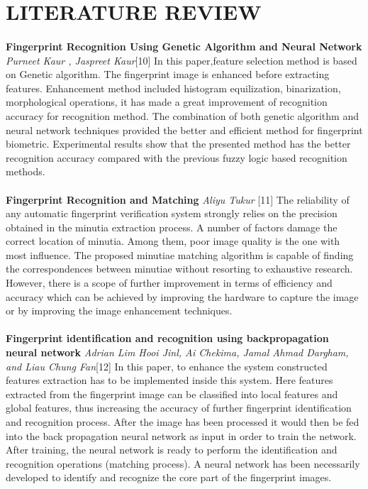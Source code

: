 \documentclass[a4paper,12pt,oneside]{article}
\begin{document}
\newpage
\section{LITERATURE REVIEW}
\paragraph{}
\textbf{Fingerprint Recognition Using Genetic Algorithm and Neural Network} \textit{Purneet Kaur , Jaspreet Kaur}[10] In this paper,feature selection method is based on Genetic algorithm. The fingerprint image is enhanced before extracting features. Enhancement method included histogram equilization, binarization, morphological operations, it has made a great improvement of recognition accuracy for recognition method. The combination of both genetic algorithm and neural network techniques provided the better and efficient method for fingerprint biometric. Experimental results show that the presented method has the better recognition accuracy compared with the previous fuzzy logic based recognition methods.
 
\paragraph{}
\textbf{Fingerprint Recognition and Matching }\textit{Aliyu Tukur
}[11] The reliability of any automatic fingerprint verification system strongly relies on the precision obtained in the minutia extraction process. A number of factors damage the correct location of minutia. Among them, poor image quality is the one with most influence. The proposed minutiae matching algorithm is  capable of finding the correspondences between minutiae without resorting to exhaustive research. However, there is a scope of further improvement in terms of efficiency and accuracy which can be achieved by improving  the hardware to
capture the image or by improving the image enhancement techniques.






\paragraph{}
\textbf{Fingerprint identification and recognition using backpropagation neural network}\textit{ Adrian Lim Hooi Jinl, Ai Chekima, Jamal Ahmad Dargham, and Liau Chung Fan}[12] In this paper, to enhance the system constructed features
extraction has to be implemented inside this system.
Here features extracted from the
fingerprint image can be classified into local features
and global features, thus increasing the accuracy of
further fingerprint identification and recognition
process. After the image has been processed it
would then be fed into the back propagation neural
network as input in order to train the network. After
training, the neural network is ready to perform the
identification and recognition operations (matching
process). A neural network has been necessarily
developed to identify and recognize the core part of
the fingerprint images.
\end{document}
